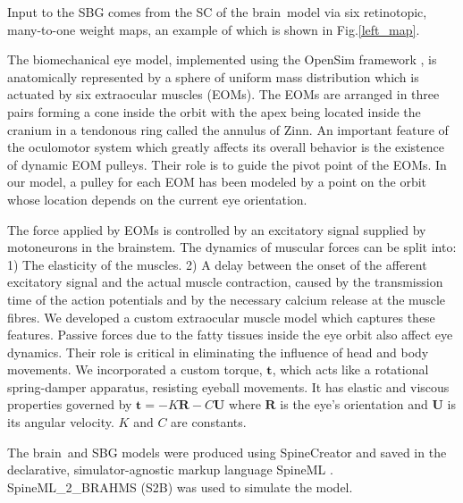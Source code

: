 \documentclass[11pt, a4paper]{article}
\newcommand{\brain}{brain}
\newcommand{\stob}{S2B}
\newcommand{\mycite}[1]{\cite{#1}}
\begin{document}
Input to the SBG comes from the SC of the \brain~model via
six retinotopic, many-to-one weight maps, an example of which is
shown in Fig.\ref{left_map}.

The biomechanical eye model, implemented using the OpenSim framework
\mycite{seth_opensim:_2011}, is anatomically represented by a sphere of
uniform mass distribution which is actuated by six extraocular muscles
(EOMs). The EOMs are arranged in three pairs forming a cone inside the
orbit with the apex being located inside the cranium in a tendonous
ring called the annulus of Zinn. An important feature of the
oculomotor system which greatly affects its overall behavior is the
existence of dynamic EOM pulleys. Their role is to guide the pivot
point of the EOMs. In our model, a pulley for each EOM has been
modeled by a point on the orbit whose location depends on the current
eye orientation.

The force applied by EOMs is controlled by an excitatory signal
supplied by motoneurons in the brainstem. The dynamics of muscular
forces can be split into: 1) The elasticity of the muscles. 2) A delay
between the onset of the afferent excitatory signal and the actual
muscle contraction, caused by the transmission time of the action
potentials and by the necessary calcium release at the muscle
fibres. We developed a custom extraocular muscle model which captures
these features.
Passive forces due to the fatty tissues inside the eye orbit also
affect eye dynamics. Their role is critical in eliminating the
influence of head and body movements. We incorporated a custom torque, $\mathbf{t}$,
which acts like a rotational spring-damper apparatus, resisting
eyeball movements. It has elastic and viscous properties governed by
$\mathbf{t} = -K\mathbf{R}-C\mathbf{U}$ where $\mathbf{R}$ is the
eye's orientation and $\mathbf{U}$ is its angular velocity. $K$ and
$C$ are constants.

The \brain~and SBG models were produced using SpineCreator
\mycite{cope_spinecreator_2015} and saved in the declarative,
simulator-agnostic markup language
SpineML \mycite{richmond_model_2014}. SpineML\_2\_BRAHMS
(\stob) \mycite{cope_spineml_2_brahms_2015-1} was used to simulate the
model.
\end{document}
